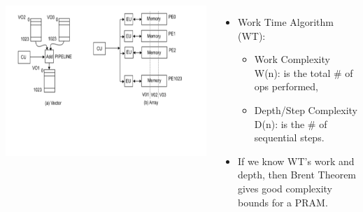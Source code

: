\documentclass{beamer}
\newcommand{\emp}[1]{\textcolor{DikuRed}{ #1}}
\begin{document}
\begin{frame}[fragile,t]
\begin{columns}
\includegraphics[height=33ex]{Figures/L2/VectorMachine}
\vspace{-15ex}
\begin{itemize}
    \item \emp{Work Time Algorithm (WT):}
    \begin{itemize}
        \item \emp{Work Complexity W(n)}:       is the total \# of ops performed,
        \item \emp{Depth/Step Complexity D(n)}: is the \# of sequential steps.
    \end{itemize}
    \item If we know WT's work and depth, then Brent Theorem 
            gives good complexity bounds for a PRAM.
\end{itemize}
\end{columns}

\end{frame}
\end{document}
